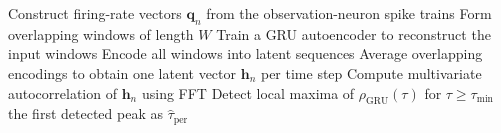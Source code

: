\documentclass[a4paper]{article}
\begin{document}
      \begin{algorithm}[H]
         \caption{GRU-based latent autocorrelation for period discovery}
         \begin{algorithmic}[1]
            \State Construct firing-rate vectors $\mathbf{q}_n$ from the observation-neuron spike trains
            \State Form overlapping windows of length $W$
            \State Train a GRU autoencoder to reconstruct the input windows
            \State Encode all windows into latent sequences
            \State Average overlapping encodings to obtain one latent vector $\mathbf{h}_n$ per time step
            \State Compute multivariate autocorrelation of $\mathbf{h}_n$ using FFT
            \State Detect local maxima of $\rho_{\mathrm{GRU}}(\tau)$ for $\tau \geq \tau_{\min}$
            \State \Return the first detected peak as $\hat{\tau}_{\mathrm{per}}$
         \end{algorithmic}
      \end{algorithm}
      

      
\end{document}
